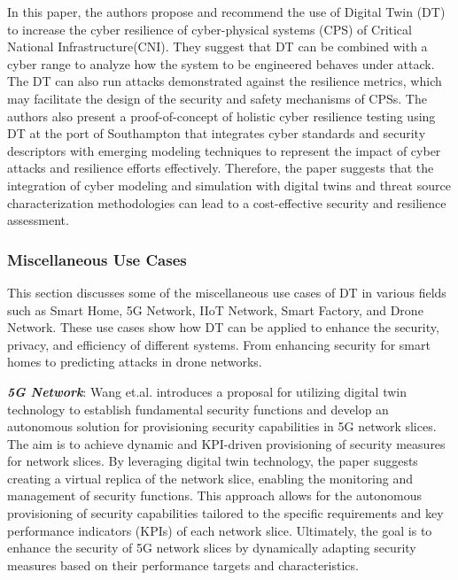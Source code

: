 In \cite{epiphaniouDigitalTwinsCyber2023a} this paper, the authors propose and recommend the use of Digital Twin (DT) to increase the cyber resilience of cyber-physical systems (CPS) of Critical National Infrastructure(CNI). They suggest that DT can be combined with a cyber range to analyze how the system to be engineered behaves under attack. The DT can also run attacks demonstrated against the resilience metrics, which may facilitate the design of the security and safety mechanisms of CPSs. The authors also present a proof-of-concept of holistic cyber resilience testing using DT at the port of Southampton that integrates cyber standards and security descriptors with emerging modeling techniques to represent the impact of cyber attacks and resilience efforts effectively. Therefore, the paper suggests that the integration of cyber modeling and simulation with digital twins and threat source characterization methodologies can lead to a cost-effective security and resilience assessment.

\subsubsection*{Miscellaneous Use Cases } 
This section discusses some of the miscellaneous use cases of DT in various fields such as Smart Home, 5G Network, IIoT Network, Smart Factory, and Drone Network. These use cases show how DT can be applied to enhance the security, privacy, and efficiency of different systems. From enhancing security for smart homes to predicting attacks in drone networks.



\textbf{\textit{5G Network}}: Wang et.al. \cite{wangDigitalTwinNetwork2022a} introduces a proposal for utilizing digital twin technology to establish fundamental security functions and develop an autonomous solution for provisioning security capabilities in 5G network slices. The aim is to achieve dynamic and KPI-driven provisioning of security measures for network slices. By leveraging digital twin technology, the paper suggests creating a virtual replica of the network slice, enabling the monitoring and management of security functions. This approach allows for the autonomous provisioning of security capabilities tailored to the specific requirements and key performance indicators (KPIs) of each network slice. Ultimately, the goal is to enhance the security of 5G network slices by dynamically adapting security measures based on their performance targets and characteristics.

